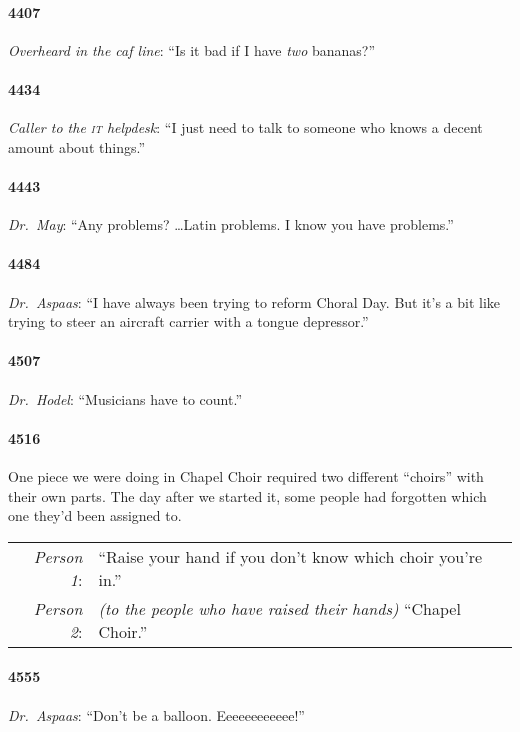 \documentclass[10pt]{memoir}
\newcommand{\speakertag}[1]{\emph{#1}: }
\newcommand{\st}{\speakertag}
\newcommand{\intro}[1]{\emph{#1}}
\begin{document}
\paragraph{4407} \intro{Overheard in the caf line}: ``Is it bad if I have \emph{two} bananas?''

\paragraph{4434} \intro{Caller to the \textsc{it} helpdesk}: ``I just need to talk to someone who knows a decent amount about things.''

\paragraph{4443} \intro{Dr.\ May}: ``Any problems? \ldots Latin problems. I know you have problems.''

\paragraph{4484} \intro{Dr.\ Aspaas}: ``I have always been trying to reform Choral Day. But it's a bit like trying to steer an aircraft carrier with a tongue depressor.''

\paragraph{4507} \intro{Dr.\ Hodel}: ``Musicians have to count.''

\paragraph{4516} One piece we were doing in Chapel Choir required two different ``choirs'' with their own parts. The day after we started it, some people had forgotten which one they'd been assigned to.\\

\noindent \begin{tabularx}{\textwidth}{r X}
\st{Person 1} & ``Raise your hand if you don't know which choir you're in.'' \\
\st{Person 2} & \emph{(to the people who have raised their hands)} ``Chapel Choir.''\\
\end{tabularx}

\paragraph{4555} \intro{Dr.\ Aspaas}: ``Don't be a balloon. Eeeeeeeeeeee!''
\end{document}
